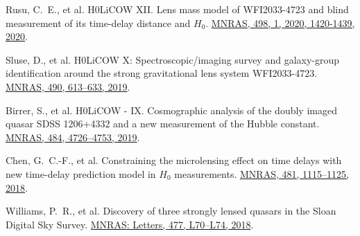 \documentclass[margin, line]{res}
\begin{document}
\begin{resume}
\begin{etaremune}
	\item Rusu, C.~E., et al. H0LiCOW XII. Lens mass model of WFI2033-4723 and blind measurement of its time-delay distance and $H_0$. \href{http://adsabs.harvard.edu/abs/2019arXiv190509338R}{MNRAS, 498, 1, 2020, 1420-1439, 2020}.
	\item Sluse, D., et al. H0LiCOW X: Spectroscopic/imaging survey and galaxy-group identification around the strong gravitational lens system WFI2033-4723. \href{https://academic.oup.com/mnras/article/doi/10.1093/mnras/stz2483/5561514/}{MNRAS, 490, 613--633, 2019}.
	\item Birrer, S., et al. H0LiCOW - IX. Cosmographic analysis of the doubly imaged quasar SDSS 1206+4332 and a new measurement of the Hubble constant. \href{https://doi.org/10.1093/mnras/stz200}{MNRAS, 484, 4726--4753, 2019}.
	\item Chen, G.~C.-F., et al. Constraining the microlensing effect on time delays with new time-delay prediction model in $H_0$ measurements. \href{https://doi.org/10.1093/mnras/sty2350}{MNRAS, 481, 1115--1125, 2018}.
 	\item Williams, P.~R., et al. Discovery of three strongly lensed quasars in the Sloan Digital Sky Survey. \href{https://doi.org/10.1093/mnrasl/sly043}{MNRAS: Letters, 477, L70--L74, 2018}.
\end{etaremune}


\end{resume}
\end{document}
